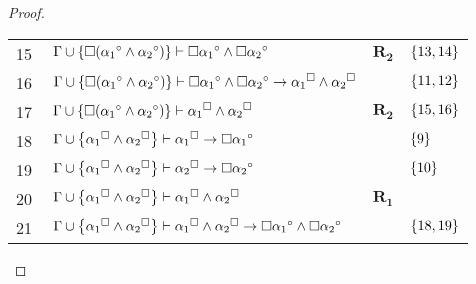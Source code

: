 \begin{tcolorbox}[enhanced jigsaw, breakable, sharp corners, colframe=black, colback=white, boxrule=0.5pt, left=1.5mm, right=1.5mm, top=1.5mm, bottom=1.5mm]
\begin{theorem}
\begin{proof}
\begin{xltabular}{\textwidth}{r | X l l}
            \scriptsize{15}\phantom{ }           & $\ \Gamma\cup\set{\nec({\alpha_1}^\circ\wedge{\alpha_2}^\circ)} \vdash \nec{\alpha_1}^\circ \wedge \nec{\alpha_2}^\circ$                                                                                                      & $\hyperref[modal.rule.2]{\mathbf{R_2}}$ & $\left\{13,14\right\}$\\[\rowskip]
            \scriptsize{16}\phantom{ }           & $\ \Gamma\cup\set{\nec({\alpha_1}^\circ\wedge{\alpha_2}^\circ)} \vdash \nec{\alpha_1}^\circ \wedge \nec{\alpha_2}^\circ \to {\alpha_1}^\medsquare \wedge {\alpha_2}^\medsquare$                                               &  & $\left\{11,12\right\}$\\[\rowskip]
            \scriptsize{17}\phantom{ }           & $\ \Gamma\cup\set{\nec({\alpha_1}^\circ\wedge{\alpha_2}^\circ)} \vdash {\alpha_1}^\medsquare \wedge {\alpha_2}^\medsquare$                                                                                                    & $\hyperref[modal.rule.2]{\mathbf{R_2}}$ & $\left\{15,16\right\}$\\[\rowskip]
            \scriptsize{18}\phantom{ }           & $\ \Gamma\cup\set{{\alpha_1}^\medsquare\wedge{\alpha_2}^\medsquare} \vdash {\alpha_1}^\medsquare \to \nec{\alpha_1}^\circ$                                                                                                    &  & $\left\{9\right\}$\\[\rowskip]
            \scriptsize{19}\phantom{ }           & $\ \Gamma\cup\set{{\alpha_1}^\medsquare\wedge{\alpha_2}^\medsquare} \vdash {\alpha_2}^\medsquare \to \nec{\alpha_2}^\circ$                                                                                                    &  & $\left\{10\right\}$\\[\rowskip]
            \scriptsize{20}\phantom{ }           & $\ \Gamma\cup\set{{\alpha_1}^\medsquare\wedge{\alpha_2}^\medsquare} \vdash {\alpha_1}^\medsquare \wedge {\alpha_2}^\medsquare$                                                                                                & $\hyperref[modal.rule.1]{\mathbf{R_1}}$        & \\[\rowskip]
            \scriptsize{21}\phantom{ }           & $\ \Gamma\cup\set{{\alpha_1}^\medsquare\wedge{\alpha_2}^\medsquare} \vdash {\alpha_1}^\medsquare \wedge {\alpha_2}^\medsquare \to \nec{\alpha_1}^\circ \wedge \nec{\alpha_2}^\circ$                                           &  & $\left\{18,19\right\}$\\[\rowskip]

\end{xltabular}
\end{proof}
\end{theorem}
\end{tcolorbox}
